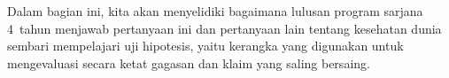 Dalam bagian ini,
kita akan menyelidiki bagaimana lulusan program sarjana
4~tahun menjawab pertanyaan ini dan pertanyaan lain tentang kesehatan dunia
sembari mempelajari uji hipotesis, yaitu
kerangka yang digunakan untuk mengevaluasi secara ketat
gagasan dan klaim yang saling bersaing.

\newcommand{\roslingAsize}{50}
\newcommand{\roslingAprop}{0.24}
\newcommand{\roslingApropcomplement}{0.76}
\newcommand{\roslingApercent}{24}
\newcommand{\roslingApercentcomplement}{76}
\newcommand{\roslingAcount}{12}
\newcommand{\roslingAcountcomplement}{38}
\newcommand{\roslingAse}{0.060}


%
%




